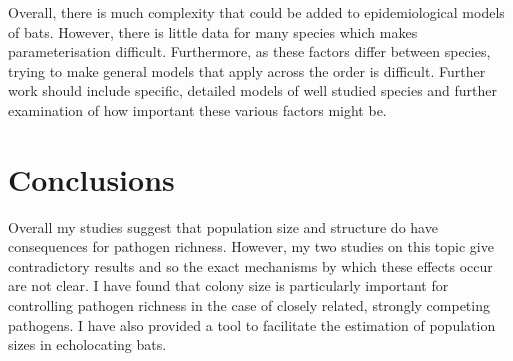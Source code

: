 Overall, there is much complexity that could be added to epidemiological models of bats.
However, there is little data for many species which makes parameterisation difficult.
Furthermore, as these factors differ between species, trying to make general models that apply across the order is difficult.
Further work should include specific, detailed models of well studied species and further examination of how important these various factors might be.




\section{Conclusions}


Overall my studies suggest that population size and structure do have consequences for pathogen richness. 
However, my two studies on this topic give contradictory results and so the exact mechanisms by which these effects occur are not clear.
I have found that colony size is particularly important for controlling pathogen richness in the case of closely related, strongly competing pathogens.
I have also provided a tool to facilitate the estimation of population sizes in echolocating bats.



